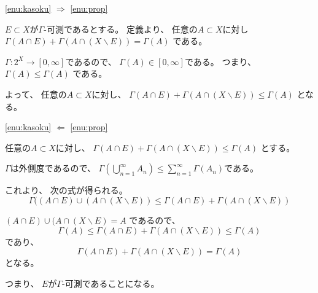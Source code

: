 \documentclass[12pt,b5paper]{ltjsarticle}
\begin{document}
\begin{enumerate}
      \eqref{enu:kasoku}
      $\Rightarrow$
      \eqref{enu:prop}

      $E\subset X$が$\Gamma$-可測であるとする。
      定義より、
      任意の$A\subset X$に対し
      $\Gamma(A\cap E) + \Gamma(A\cap (X\backslash E)) = \Gamma(A)$
      である。

      $\Gamma : 2^{X}\to[0,\infty]$であるので、
      $\Gamma(A)\in[0,\infty]$である。
      つまり、$\Gamma(A) \leq \Gamma(A)$ である。

      よって、
      任意の$A\subset X$に対し、
      $\Gamma(A\cap E) + \Gamma(A\cap (X\backslash E)) \leq \Gamma(A)$
      となる。
      

      \eqref{enu:kasoku}
      $\Leftarrow$
      \eqref{enu:prop}

      任意の$A\subset X$に対し、
      $\Gamma(A\cap E) + \Gamma(A\cap (X\backslash E)) \leq \Gamma(A)$
      とする。

      $\Gamma$は外側度であるので、
      $\Gamma(\bigcup_{n=1}^{\infty}A_{n}) \leq \sum_{n=1}^{\infty}\Gamma(A_{n})$である。

      これより、
      次の式が得られる。
      \begin{equation}
       \Gamma( (A\cap E) \cup (A\cap (X\backslash E) )
        \leq
       \Gamma(A\cap E) + \Gamma(A\cap (X\backslash E))
      \end{equation}

      $(A\cap E) \cup (A\cap (X\backslash E) =A$
      であるので、
      \begin{equation}
       \Gamma(A)
        \leq
       \Gamma(A\cap E) + \Gamma(A\cap (X\backslash E))
       \leq
       \Gamma(A)
      \end{equation}
      であり、
      \begin{equation}
       \Gamma(A\cap E) + \Gamma(A\cap (X\backslash E))
       =
       \Gamma(A)
      \end{equation}
      となる。

      つまり、
      $E$が$\Gamma$-可測であることになる。



      \hrulefill

\end{enumerate}

\hrulefill
\end{document}

